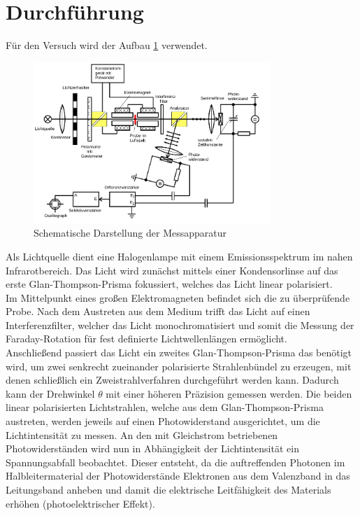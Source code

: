 \section{Durchführung}
\label{sec:Durchführung}
Für den Versuch wird der Aufbau \ref{fig:Bild2} verwendet.
\begin{figure}
	\centering
	\includegraphics[width=0.8\textwidth]{pictures/aufbau.png}
	\caption{Schematische Darstellung der Messapparatur \cite{Anleitung}}
	\label{fig:Bild2}
\end{figure}
Als Lichtquelle dient eine Halogenlampe mit einem Emissionsspektrum im nahen Infrarotbereich.
Das Licht wird zunächst mittels einer Kondensorlinse auf das erste Glan-Thompson-Prisma fokussiert, welches das Licht linear polarisiert.\\
Im Mittelpunkt eines großen Elektromagneten befindet sich die zu überprüfende Probe.
Nach dem Austreten aus dem Medium trifft das Licht auf einen Interferenzfilter, welcher das Licht monochromatisiert und somit die Messung der Faraday-Rotation für fest definierte Lichtwellenlängen ermöglicht.\\
Anschließend passiert das Licht ein zweites Glan-Thompson-Prisma das
benötigt wird, um zwei senkrecht zueinander polarisierte Strahlenbündel zu erzeugen, mit denen
schließlich ein Zweistrahlverfahren durchgeführt werden kann. Dadurch kann der Drehwinkel $\theta$ mit einer höheren Präzision gemessen werden. Die beiden linear polarisierten Lichtstrahlen, welche aus dem
Glan-Thompson-Prisma austreten, werden jeweils auf einen Photowiderstand ausgerichtet, um die
Lichtintensität zu messen. An den mit Gleichstrom betriebenen Photowiderständen wird nun in
Abhängigkeit der Lichtintensität ein Spannungsabfall beobachtet. Dieser entsteht, da die auftreffenden Photonen im Halbleitermaterial der Photowiderstände Elektronen aus dem Valenzband in das Leitungsband anheben und damit die elektrische Leitfähigkeit des Materials erhöhen (photoelektrischer Effekt).\\
